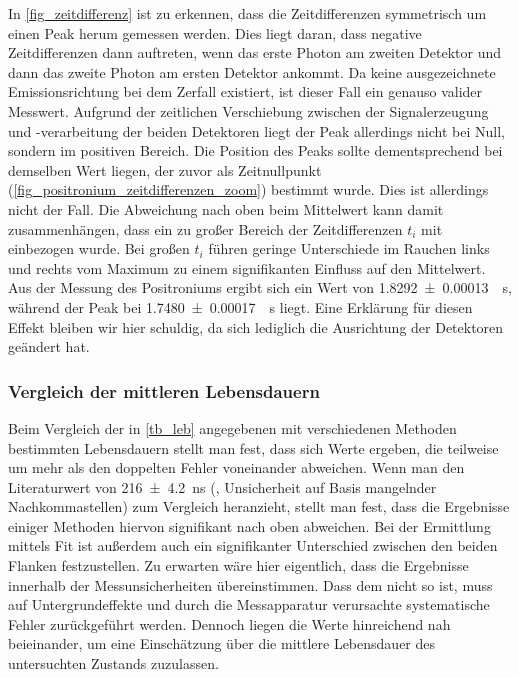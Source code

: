 \documentclass[
	a4paper,
	12pt,
	pagesize,
	ngerman
]{scrartcl}
\begin{document}
	In \cref{fig_zeitdifferenz} ist zu erkennen, dass die Zeitdifferenzen symmetrisch um einen Peak herum gemessen werden.
	Dies liegt daran, dass negative Zeitdifferenzen dann auftreten, wenn das erste Photon am zweiten Detektor und dann das zweite Photon am ersten Detektor ankommt.
	Da keine ausgezeichnete Emissionsrichtung bei dem Zerfall existiert, ist dieser Fall ein genauso valider Messwert.
	Aufgrund der zeitlichen Verschiebung zwischen der Signalerzeugung und -verarbeitung der beiden Detektoren liegt der Peak allerdings nicht bei Null, sondern im positiven Bereich.
	Die Position des Peaks sollte dementsprechend bei demselben Wert liegen, der zuvor als Zeitnullpunkt (\cref{fig_positronium_zeitdifferenzen_zoom}) bestimmt wurde.
	Dies ist allerdings nicht der Fall.
	Die Abweichung nach oben beim Mittelwert kann damit zusammenhängen, dass ein zu großer Bereich der Zeitdifferenzen $t_i$ mit einbezogen wurde.
	Bei großen $t_i$ führen geringe Unterschiede im Rauchen links und rechts vom Maximum zu einem signifikanten Einfluss auf den Mittelwert.
	Aus der Messung des Positroniums ergibt sich ein Wert von \SI{1,8292+-0.00013}{\mu s}, während der Peak bei \SI{1,7480+-0.00017}{\mu s} liegt.
	Eine Erklärung für diesen Effekt bleiben wir hier schuldig, da sich lediglich die Ausrichtung der Detektoren geändert hat.


	\subsubsection{Vergleich der mittleren Lebensdauern}
	Beim Vergleich der in \cref{tb_leb} angegebenen mit verschiedenen Methoden bestimmten Lebensdauern stellt man fest, dass sich Werte ergeben, die teilweise um mehr als den doppelten Fehler voneinander abweichen.
	Wenn man den Literaturwert von \SI{216 \pm 4,2}{\nano s} (\cite{Anleitung}, Unsicherheit auf Basis mangelnder Nachkommastellen) zum Vergleich heranzieht, stellt man fest, dass die Ergebnisse einiger Methoden hiervon signifikant nach oben abweichen.
	Bei der Ermittlung mittels Fit ist außerdem auch ein signifikanter Unterschied zwischen den beiden Flanken festzustellen.
	Zu erwarten wäre hier eigentlich, dass die Ergebnisse innerhalb der Messunsicherheiten übereinstimmen.
	Dass dem nicht so ist, muss auf Untergrundeffekte und durch die Messapparatur verursachte systematische Fehler zurückgeführt werden.
	Dennoch liegen die Werte hinreichend nah beieinander, um eine Einschätzung über die mittlere Lebensdauer des untersuchten Zustands zuzulassen.
\end{document}

